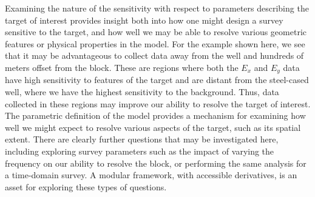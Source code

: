 Examining the nature of the sensitivity with respect to parameters
describing the target of interest provides insight both into how one might
design a survey sensitive to the target, and how well we may be able to
resolve various geometric features or physical properties in the model.
For the example shown here, we see that it may be advantageous to collect data away from the
well and hundreds of meters offset from the block. These are regions where both the
$E_x$ and $E_y$ data have high sensitivity to features of the target
and are distant from the steel-cased well, where we have the highest sensitivity to the background.
Thus, data collected in
these regions may improve our ability to resolve the target of interest.
The parametric definition of the model provides a mechanism for examining how well we might expect
to resolve various aspects of the target, such as its spatial extent.
There are clearly further questions that may be investigated here, including
exploring survey parameters such as the impact of varying the frequency on our
ability to resolve the block, or performing the same analysis for a time-domain survey.
A modular framework, with accessible derivatives, is an asset for exploring
these types of questions.





